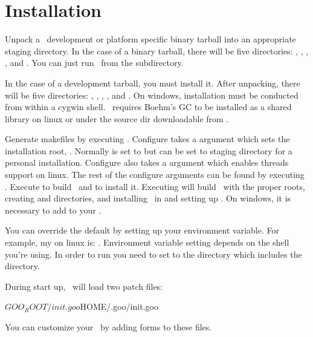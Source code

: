 \documentclass[twoside,twocolumn,9pt]{extarticle}
\begin{document}
\section{Installation}

Unpack a \goo\ development or platform specific binary tarball into an
appropriate staging directory.  In the case of a binary tarball, there
will be five directories: , , ,
, and .  You can just run \goo\ from the
 subdirectory.

In the case of a development tarball, you must install it.  After
unpacking, there will be five directories: , ,
, , and .  On windows, installation must
be conducted from within a cygwin shell.  \goo\ requires Boehm's GC to
be installed as a shared library on linux or under the source dir
 downloadable from
.

Generate makefiles by executing .  Configure takes a
 argument which sets the installation root,
.  Normally  is set to 
but can be set to staging directory for a personal installation.
Configure also takes a  argument which enables
threads support on linux.  The rest of the configure arguments can be
found by executing .  Execute  to
build \goo\ and  to install it.  Executing
 will build \goo\ with the proper roots, creating
 and  directories, and installing \goo\ in
 and setting up .  On windows, it is necessary to
add  to your .

You can override the default  by
setting up your  environment variable.  
For example, my  on linux is: 
.
Environment variable setting depends on the shell you're using.
In order to run  you need to
set  to the directory which includes the 
directory.  

During start up, \goo\ will load two patch files:

\begin{exv}
${GOO_ROOT}/init.goo
${HOME}/.goo/init.goo
\end{exv}

You can customize your \goo\ by adding forms to these files.
\end{document}
